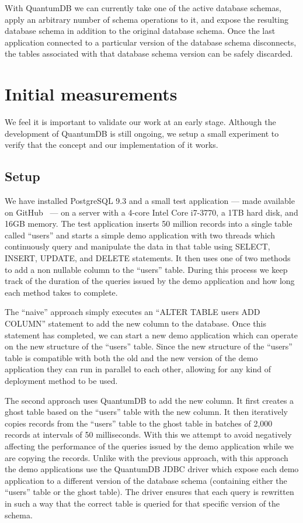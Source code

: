 \documentclass[conference]{IEEEtran}
\begin{document}
With QuantumDB we can currently take one of the active database schemas, apply an arbitrary number of schema operations to it, and expose the resulting database schema in addition to the original database schema. Once the last application connected to a particular version of the database schema disconnects, the tables associated with that database schema version can be safely discarded.

\section{Initial measurements} %

We feel it is important to validate our work at an early stage. Although the development of QuantumDB is still ongoing, we setup a small experiment to verify that the concept and our implementation of it works. 

\subsection{Setup}
We have installed PostgreSQL 9.3 and a small test application --- made available on GitHub~\cite{QuantumDB-RelEng-Demo} --- on a server with a 4-core Intel Core i7-3770, a 1TB hard disk, and 16GB memory. The test application inserts 50 million records into a single table called ``users'' and starts a simple demo application with two threads which continuously query and manipulate the data in that table using SELECT, INSERT, UPDATE, and DELETE statements. It then uses one of two methods to add a non nullable column to the ``users'' table. During this process we keep track of the duration of the queries issued by the demo application and how long each method takes to complete. 

The ``naive'' approach simply executes an ``ALTER TABLE users ADD COLUMN'' statement to add the new column to the database. Once this statement has completed, we can start a new demo application which can operate on the new structure of the ``users'' table. Since the new structure of the ``users'' table is compatible with both the old and the new version of the demo application they can run in parallel to each other, allowing for any kind of deployment method to be used. 

The second approach uses QuantumDB to add the new column. It first creates a ghost table based on the ``users'' table with the new column. It then iteratively copies records from the ``users'' table to the ghost table in batches of 2,000 records at intervals of 50 milliseconds. With this we attempt to avoid negatively affecting the performance of the queries issued by the demo application while we are copying the records. Unlike with the previous approach, with this approach the demo applications use the QuantumDB JDBC driver which expose each demo application to a different version of the database schema (containing either the ``users'' table or the ghost table). The driver ensures that each query is rewritten in such a way that the correct table is queried for that specific version of the schema.
\end{document}
